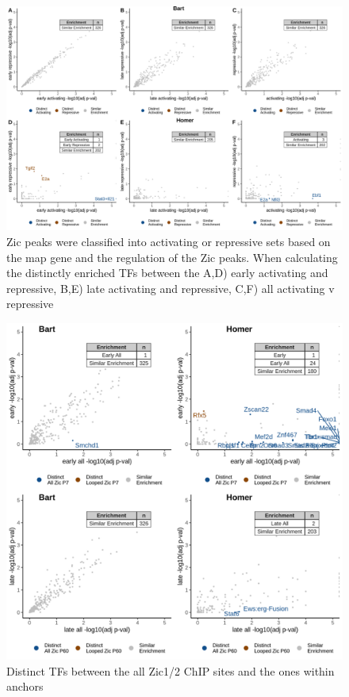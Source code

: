 \documentclass[fleqn,10pt,twocolumn]{wlscirep}
\begin{document}
\begin{figure}[ht]
\centering
\includegraphics[width=.95\textwidth]{../figures/supp_figure_rrho.png}
\caption{Zic peaks were classified into activating or repressive sets based on the map gene and the regulation of the Zic peaks. When calculating the distinctly enriched TFs between the A,D) early activating and repressive, B,E) late activating and repressive, C,F) all activating v repressive}
\label{fig:ActvRep}
\end{figure}

\begin{figure}[ht]
\centering
\includegraphics[width=.95\textwidth]{../figures/supp_figure_rrho_allvlooped.png}
\caption{Distinct TFs between the all Zic1/2 ChIP sites and the ones within anchors}
\label{fig:loopved_all}
\end{figure}
\end{document}
